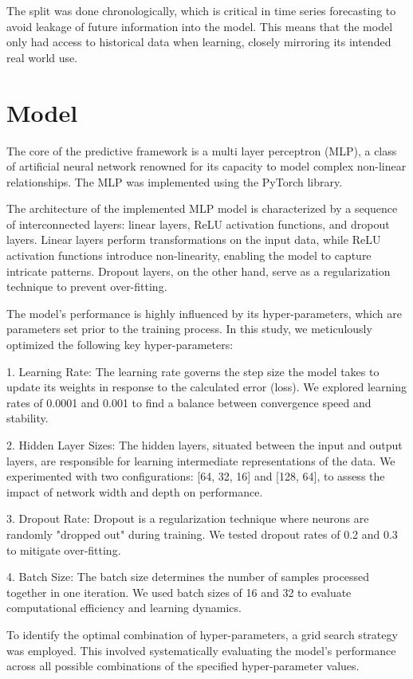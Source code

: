 \documentclass[a4paper, 12pt]{article}
\begin{document}
The split was done chronologically, which is critical in time series forecasting to avoid leakage of future information into the model. This means that the model only had access to historical data when learning, closely mirroring its intended real world use.

\section{Model}
The core of the predictive framework is a multi layer perceptron (MLP), a class of artificial neural network renowned for its capacity to model complex non-linear relationships. The MLP was implemented using the PyTorch library. 

The architecture of the implemented MLP model is characterized by a sequence of interconnected layers: linear layers, ReLU activation functions, and dropout layers. Linear layers perform transformations on the input data, while ReLU activation functions introduce non-linearity, enabling the model to capture intricate patterns. Dropout layers, on the other hand, serve as a regularization technique to prevent over-fitting.

The model's performance is highly influenced by its hyper-parameters, which are parameters set prior to the training process. In this study, we meticulously optimized the following key hyper-parameters:

1. Learning Rate: The learning rate governs the step size the model takes to update its weights in response to the calculated error (loss). We explored learning rates of 0.0001 and 0.001 to find a balance between convergence speed and stability.

2. Hidden Layer Sizes: The hidden layers, situated between the input and output layers, are responsible for learning intermediate representations of the data. We experimented with two configurations: [64, 32, 16] and [128, 64], to assess the impact of network width and depth on performance.

3. Dropout Rate: Dropout is a regularization technique where neurons are randomly "dropped out" during training. We tested dropout rates of 0.2 and 0.3 to mitigate over-fitting.

4. Batch Size: The batch size determines the number of samples processed together in one iteration. We used batch sizes of 16 and 32 to evaluate computational efficiency and learning dynamics.

To identify the optimal combination of hyper-parameters, a grid search strategy was employed. This involved systematically evaluating the model's performance across all possible combinations of the specified hyper-parameter values.
\end{document}
